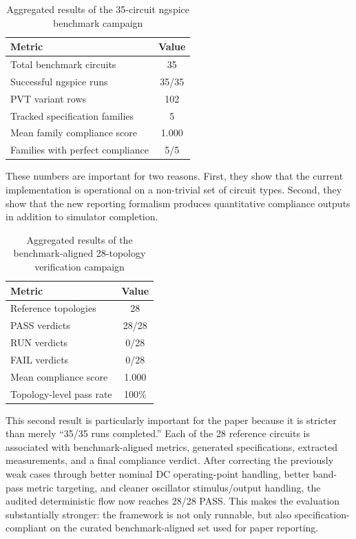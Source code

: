 \documentclass[conference]{IEEEtran}
\begin{document}
\begin{table}[t]
\caption{Aggregated results of the 35-circuit ngspice benchmark campaign}
\label{tab:campaign}
\centering
\begin{tabular}{lc}
\toprule
Metric & Value \\
\midrule
Total benchmark circuits & 35 \\
Successful ngspice runs & 35/35 \\
PVT variant rows & 102 \\
Tracked specification families & 5 \\
Mean family compliance score & 1.000 \\
Families with perfect compliance & 5/5 \\
\bottomrule
\end{tabular}
\end{table}

These numbers are important for two reasons. First, they show that the current implementation is operational on a non-trivial set of circuit types. Second, they show that the new reporting formalism produces quantitative compliance outputs in addition to simulator completion.

\begin{table}[t]
\caption{Aggregated results of the benchmark-aligned 28-topology verification campaign}
\label{tab:reference28}
\centering
\begin{tabular}{lc}
\toprule
Metric & Value \\
\midrule
Reference topologies & 28 \\
PASS verdicts & 28/28 \\
RUN verdicts & 0/28 \\
FAIL verdicts & 0/28 \\
Mean compliance score & 1.000 \\
Topology-level pass rate & 100\% \\
\bottomrule
\end{tabular}
\end{table}

This second result is particularly important for the paper because it is stricter than merely ``35/35 runs completed.'' Each of the 28 reference circuits is associated with benchmark-aligned metrics, generated specifications, extracted measurements, and a final compliance verdict. After correcting the previously weak cases through better nominal DC operating-point handling, better band-pass metric targeting, and cleaner oscillator stimulus/output handling, the audited deterministic flow now reaches 28/28 PASS. This makes the evaluation substantially stronger: the framework is not only runnable, but also specification-compliant on the curated benchmark-aligned set used for paper reporting.
\end{document}
